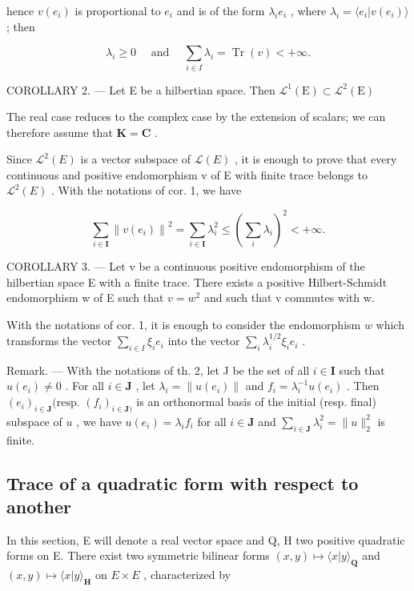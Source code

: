 hence \(v(e_{i})\) is proportional to \(e_{i}\) and is of the form \(\lambda_{i}e_{i}\) , where \(\lambda_{i}=\langle e_{i}|v(e_{i})\rangle\) ; then

\[
\lambda_ {i} \geqslant 0 \quad \text { and } \quad \sum_ {i \in I} \lambda_ {i} = \operatorname{Tr} (v) <   + \infty .
\]

COROLLARY 2. --- Let E be a hilbertian space. Then \(\mathcal{L}^{1}(\mathrm{E})\subset \mathcal{L}^{2}(\mathrm{E})\)

The real case reduces to the complex case by the extension of scalars; we can therefore assume that \(\mathbf{K} = \mathbf{C}\) .

Since \(\mathcal{L}^{2}(E)\) is a vector subspace of \(\mathcal{L}(E)\) , it is enough to prove that every continuous and positive endomorphism v of E with finite trace belongs to \(\mathcal{L}^{2}(E)\) . With the notations of cor. 1, we have

\[
\sum_ {i \in \mathbf {I}} \left\| v (e _ {i}) \right\| ^ {2} = \sum_ {i \in \mathbf {I}} \lambda_ {i} ^ {2} \leqslant (\sum_ {i} \lambda_ {i}) ^ {2} <   + \infty .
\]

COROLLARY 3. --- Let v be a continuous positive endomorphism of the hilbertian space E with a finite trace. There exists a positive Hilbert-Schmidt endomorphism w of E such that \(v = w^{2}\) and such that v commutes with w.

With the notations of cor. 1, it is enough to consider the endomorphism \(w\) which transforms the vector \(\sum_{i\in I}\xi_i e_i\) into the vector \(\sum_{i}\lambda_i^{1 / 2}\xi_i e_i\) .

Remark. --- With the notations of th. 2, let J be the set of all \(i \in \mathbf{I}\) such that \(u(e_i) \neq 0\) . For all \(i \in \mathbf{J}\) , let \(\lambda_i = \| u(e_i)\|\) and \(f_i = \lambda_i^{-1}u(e_i)\) . Then \((e_i)_{i \in \mathbf{J}}(\text{resp. } (f_i)_{i \in \mathbf{J})}\) is an orthonormal basis of the initial (resp. final) subspace of \(u\) , we have \(u(e_i) = \lambda_i f_i\) for all \(i \in \mathbf{J}\) and \(\sum_{i \in \mathbf{J}} \lambda_i^2 = \| u\|_2^2\) is finite.

\subsection{Trace of a quadratic form with respect to another}

In this section, E will denote a real vector space and Q, H two positive quadratic forms on E. There exist two symmetric bilinear forms \((x, y) \mapsto \langle x | y \rangle_{\mathbf{Q}}\) and \((x, y) \mapsto \langle x | y \rangle_{\mathbf{H}}\) on \(E \times E\) , characterized by

